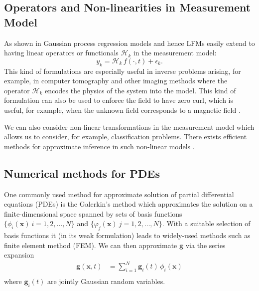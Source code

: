 \documentclass[journal]{IEEEtran}
\begin{document}
\subsection{Operators and Non-linearities in Measurement Model}

As shown in \cite{Sarkka:2011,Sarkka+Hartikainen:2012,Sarkka+Solin+Hartikainen:2013} Gaussian process regression models and hence LFMs easily extend to having linear operators or functionals $\mathcal{H}_k$ in the measurement model:
%
\begin{equation}
  y_k = \mathcal{H}_k \, f(\cdot,t) + \epsilon_k.
\end{equation}
%
This kind of formulations are especially useful in inverse problems \cite{Kaipio+Somersalo:2005} arising, for example, in computer tomography and other imaging methods where the operator $\mathcal{H}_k$ encodes the physics of the system into the model. This kind of formulation can also be used to enforce the field to have zero curl, which is useful, for example, when the unknown field corresponds to a magnetic field \cite{Solin:2017}.

We can also consider non-linear transformations in the measurement model which allows us to consider, for example, classification problems. There exists efficient methods for approximate inference in such non-linear models \cite{Rasmussen+Williams:2006,Sarkka:2013}.

\subsection{Numerical methods for PDEs}

One commonly used method for approximate solution of partial differential equations (PDEs) is the Galerkin's method which approximates the solution on a finite-dimensional space spanned by sets of basis functions $\{ \phi_i(\mathbf{x})~i=1,2,\ldots,N \}$ and $\{ \varphi_j(\mathbf{x})~j=1,2,\ldots,N \}$. With a suitable selection of basis functions it (in its weak formulation) leads to widely-used methods such as finite element method (FEM). We can then approximate $\mathbf{g}$ via the series expansion
%
\begin{equation}
\begin{split}
   \mathbf{g}(\mathbf{x},t) &= \sum_{i=1}^N \mathbf{g}_i(t) \, \phi_i(\mathbf{x}) \\
\end{split}
\end{equation}
%
where $\mathbf{g}_i(t)$ are jointly Gaussian random variables.
\end{document}
